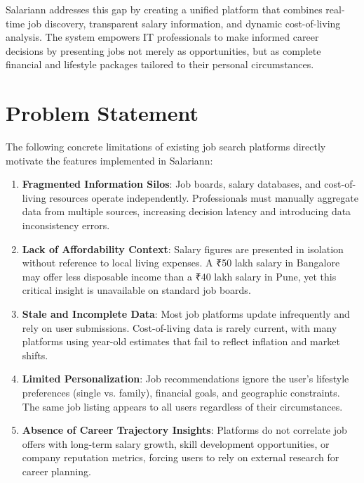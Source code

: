 \documentclass[12pt,a4paper,oneside]{report}
\begin{document}
Salariann addresses this gap by creating a unified platform that combines real-time job discovery, transparent salary information, and dynamic cost-of-living analysis. The system empowers IT professionals to make informed career decisions by presenting jobs not merely as opportunities, but as complete financial and lifestyle packages tailored to their personal circumstances.

\section{Problem Statement}

The following concrete limitations of existing job search platforms directly motivate the features implemented in Salariann:

\begin{enumerate}
    \item \textbf{Fragmented Information Silos}: Job boards, salary databases, and cost-of-living resources operate independently. Professionals must manually aggregate data from multiple sources, increasing decision latency and introducing data inconsistency errors.
    
    \item \textbf{Lack of Affordability Context}: Salary figures are presented in isolation without reference to local living expenses. A ₹50 lakh salary in Bangalore may offer less disposable income than a ₹40 lakh salary in Pune, yet this critical insight is unavailable on standard job boards.
    
    \item \textbf{Stale and Incomplete Data}: Most job platforms update infrequently and rely on user submissions. Cost-of-living data is rarely current, with many platforms using year-old estimates that fail to reflect inflation and market shifts.
    
    \item \textbf{Limited Personalization}: Job recommendations ignore the user's lifestyle preferences (single vs. family), financial goals, and geographic constraints. The same job listing appears to all users regardless of their circumstances.
    
    \item \textbf{Absence of Career Trajectory Insights}: Platforms do not correlate job offers with long-term salary growth, skill development opportunities, or company reputation metrics, forcing users to rely on external research for career planning.
\end{enumerate}
\end{document}
